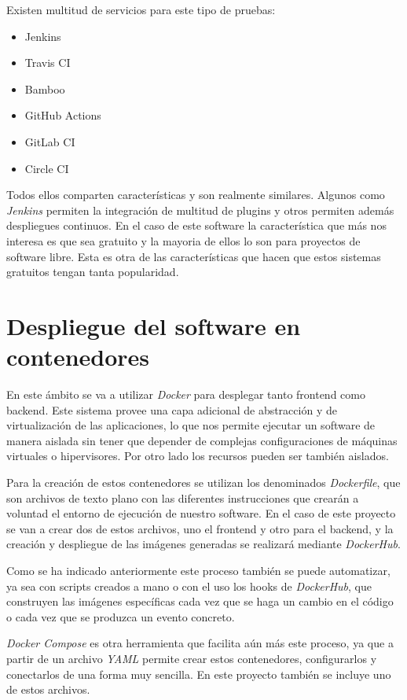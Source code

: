 \bigskip
Existen multitud de servicios para este tipo de pruebas:
\begin{itemize}
	\item Jenkins
	\item Travis CI
	\item Bamboo
	\item GitHub Actions
	\item GitLab CI
	\item Circle CI
\end{itemize}

Todos ellos comparten características y son realmente similares. Algunos como \textit{Jenkins} permiten la integración de multitud de plugins y otros permiten además despliegues continuos. En el caso de este software la característica que más nos interesa es que sea gratuito y la mayoria de ellos lo son para proyectos de software libre. Esta es otra de las características que hacen que estos sistemas gratuitos tengan tanta popularidad.




\section{Despliegue del software en contenedores}

En este ámbito se va a utilizar \textit{Docker} para desplegar tanto frontend como backend. Este sistema provee una capa adicional de abstracción y de virtualización de las aplicaciones, lo que nos permite ejecutar un software de manera aislada sin tener que depender de complejas configuraciones de máquinas virtuales o hipervisores. Por otro lado los recursos pueden ser también aislados.

Para la creación de estos contenedores se utilizan los denominados \textit{Dockerfile}, que son archivos de texto plano con las diferentes instrucciones que crearán a voluntad el entorno de ejecución de nuestro software. En el caso de este proyecto se van a crear dos de estos archivos, uno el frontend y otro para el backend, y la creación y despliegue de las imágenes generadas se realizará mediante \textit{DockerHub}.

Como se ha indicado anteriormente este proceso también se puede automatizar, ya sea con scripts creados a mano o con el uso los hooks de \textit{DockerHub}, que construyen las imágenes específicas cada vez que se haga un cambio en el código o cada vez que se produzca un evento concreto.

\textit{Docker Compose} es otra herramienta que facilita aún más este proceso, ya que a partir de un archivo \textit{YAML} permite crear estos contenedores, configurarlos y conectarlos de una forma muy sencilla. En este proyecto también se incluye uno de estos archivos.

